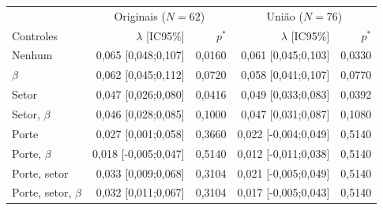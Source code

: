 \begin{tabular}{lrrrr}
\toprule
 & \multicolumn{2}{c}{Originais ($N=62$)} & \multicolumn{2}{c}{União ($N=76$)}\\ Controles & $\lambda$ [IC95\%] & $p^*$ & $\lambda$ [IC95\%] & $p^*$\\
\midrule
Nenhum & 0,065 [0,048;0,107] & 0,0160 & 0,061 [0,045;0,103] & 0,0330\\
$\beta$ & 0,062 [0,045;0,112] & 0,0720 & 0,058 [0,041;0,107] & 0,0770\\
Setor & 0,047 [0,026;0,080] & 0,0416 & 0,049 [0,033;0,083] & 0,0392\\
Setor, $\beta$ & 0,046 [0,028;0,085] & 0,1000 & 0,047 [0,031;0,087] & 0,1080\\
Porte & 0,027 [0,001;0,058] & 0,3660 & 0,022 [-0,004;0,049] & 0,5140\\
Porte, $\beta$ & 0,018 [-0,005;0,047] & 0,5140 & 0,012 [-0,011;0,038] & 0,5140\\
Porte, setor & 0,033 [0,009;0,068] & 0,3104 & 0,021 [-0,005;0,049] & 0,5140\\
Porte, setor, $\beta$ & 0,032 [0,011;0,067] & 0,3104 & 0,017 [-0,005;0,043] & 0,5140\\
\bottomrule
\end{tabular}
